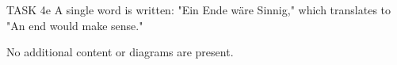 TASK 4e  
A single word is written: "Ein Ende wäre Sinnig," which translates to "An end would make sense."  

No additional content or diagrams are present.